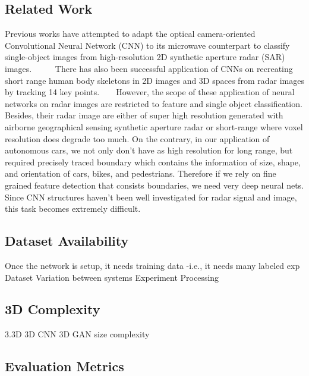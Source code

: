 \subsection{Related Work}
Previous works have attempted to adapt the optical camera-oriented Convolutional Neural Network (CNN) to its microwave counterpart to classify single-object images from high-resolution 2D synthetic aperture radar (SAR) images. ~\cite{SAR_DL} ~\cite{ship_SAR} ~\cite{change_SAR} There has also been successful application of CNNs on recreating short range human body skeletons in 2D images and 3D spaces from radar images by tracking 14 key points. ~\cite{rfpose} ~\cite{rfpose3D} However, the scope of these application of neural networks on radar images are restricted to feature and single object classification. Besides, their radar image are either of super high resolution generated with airborne geographical sensing synthetic aperture radar or short-range where voxel resolution does degrade too much. On the contrary, in our application of autonomous cars, we not only don't have as high resolution for long range, but required precisely traced boundary which contains the information of size, shape, and orientation of cars, bikes, and pedestrians. Therefore if we rely on fine grained feature detection that consists boundaries, we need very deep neural nets. Since CNN structures haven't been well investigated for radar signal and image, this task becomes extremely difficult.


\subsection{Dataset Availability}
Once the network is setup, it needs training data -i.e., it needs many labeled exp
Dataset
	Variation between systems 
	Experiment
	Processing

\subsection{3D Complexity}
3.3D
3D CNN %
3D GAN size complexity


\subsection{Evaluation Metrics}


